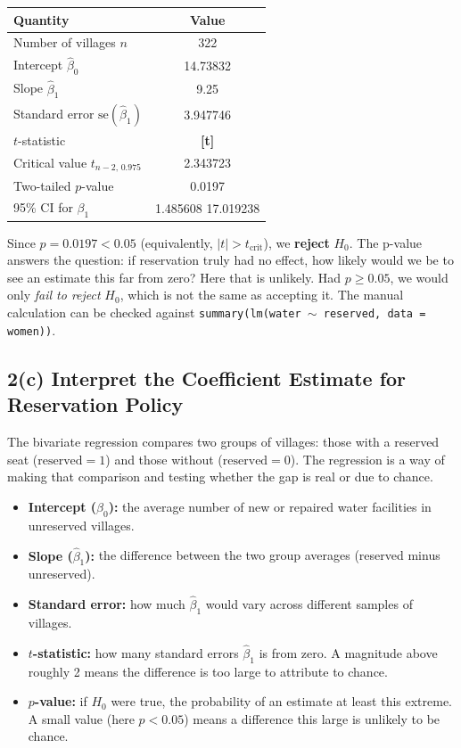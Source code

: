 \documentclass[11pt]{article}
\newcommand{\fillin}[1]{\textbf{[#1]}}
\begin{document}
\begin{center}
\begin{tabular}{lc}
\toprule
Quantity & Value \\
\midrule
Number of villages $n$ & 322 \\
Intercept $\hat\beta_0$ & 14.73832 \\
Slope $\hat\beta_1$ & 9.25 \\
Standard error $\mathrm{se}(\hat\beta_1)$ & 3.947746 \\
$t$-statistic & \fillin{t} \\
Critical value $t_{n-2,\,0.975}$ & 2.343723 \\
Two-tailed $p$-value & 0.0197 \\
95\% CI for $\beta_1$ & 1.485608 17.019238 \\
\bottomrule
\end{tabular}
\end{center}

Since $p = 0.0197 < 0.05$ (equivalently, $|t| > t_{\text{crit}}$), we \textbf{reject} $H_0$. The p-value answers the question: if reservation truly had no effect, how likely would we be to see an estimate this far from zero? Here that is unlikely. Had $p \geq 0.05$, we would only \emph{fail to reject} $H_0$, which is not the same as accepting it. The manual calculation can be checked against \texttt{summary(lm(water $\sim$ reserved, data = women))}.


\subsection*{2(c) Interpret the Coefficient Estimate for Reservation Policy}

The bivariate regression compares two groups of villages: those with a reserved seat ($\text{reserved}=1$) and those without ($\text{reserved}=0$). The regression is a way of making that comparison and testing whether the gap is real or due to chance.

\begin{itemize}
  \item \textbf{Intercept ($\hat\beta_0$):} the average number of new or repaired water facilities in unreserved villages.
  \item \textbf{Slope ($\hat\beta_1$):} the difference between the two group averages (reserved minus unreserved).
  \item \textbf{Standard error:} how much $\hat\beta_1$ would vary across different samples of villages.
  \item \textbf{$t$-statistic:} how many standard errors $\hat\beta_1$ is from zero. A magnitude above roughly 2 means the difference is too large to attribute to chance.
  \item \textbf{$p$-value:} if $H_0$ were true, the probability of an estimate at least this extreme. A small value (here $p < 0.05$) means a difference this large is unlikely to be chance.
\end{itemize}
\end{document}
